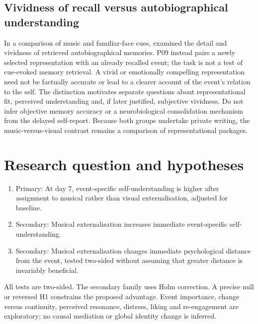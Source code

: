 \documentclass[11pt,a4paper]{article}
\begin{document}
\subsection{Vividness of recall versus autobiographical understanding}
In a comparison of music and familiar-face cues, \citet{belfi2016} examined the detail and vividness of retrieved autobiographical memories. P09 instead pairs a newly selected representation with an already recalled event; the task is not a test of cue-evoked memory retrieval. A vivid or emotionally compelling representation need not be factually accurate or lead to a clearer account of the event's relation to the self. The distinction motivates separate questions about representational fit, perceived understanding and, if later justified, subjective vividness. Do not infer objective memory accuracy or a neurobiological consolidation mechanism from the delayed self-report. Because both groups undertake private writing, the music-versus-visual contrast remains a comparison of representational packages.

\section{Research question and hypotheses}
\begin{enumerate}[label=H\arabic*.,leftmargin=*]
\item Primary: At day 7, event-specific self-understanding is higher after assignment to musical rather than visual externalisation, adjusted for baseline.
\item Secondary: Musical externalisation increases immediate event-specific self-understanding.
\item Secondary: Musical externalisation changes immediate psychological distance from the event, tested two-sided without assuming that greater distance is invariably beneficial.
\end{enumerate}
All tests are two-sided. The secondary family uses Holm correction. A precise null or reversed H1 constrains the proposed advantage. Event importance, change versus continuity, perceived resonance, distress, liking and re-engagement are exploratory; no causal mediation or global identity change is inferred.
\end{document}
